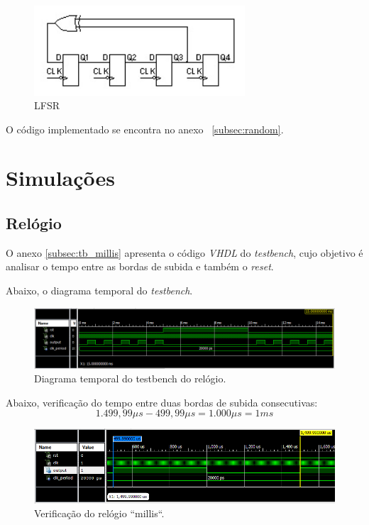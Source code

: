 \documentclass[12pt]{article}
\begin{document}
\begin{figure}[!h]
    \centering
    \includegraphics[width=0.7\textwidth]{img/lf.jpg}
    \caption{LFSR}
    \label{rand}
\end{figure}

O código implementado se encontra no anexo  ~\ref{subsec:random}.

\clearpage
\section{Simulações}
\subsection{Relógio}

O anexo \ref{subsec:tb_millis} apresenta o código \emph{VHDL} do \emph{testbench}, cujo objetivo é analisar o tempo entre as bordas de subida e também o \emph{reset}.

Abaixo, o diagrama temporal do \emph{testbench}.

\begin{figure}[!h]
    \centering
    \includegraphics[width=1.0\textwidth]{img/tb_millis.png}
    \caption{Diagrama temporal do testbench do relógio.}
\end{figure}

Abaixo, verificação do tempo entre duas bordas de subida consecutivas: \begin{equation}
    1.499,99\mu s - 499,99\mu s = 1.000\mu s = 1ms
\end{equation}

\begin{figure}[!h]
    \centering
    \includegraphics[width=1.0\textwidth]{img/tb_millis_zoom_1s.png}
    \caption{Verificação do relógio ``millis``.}
\end{figure}
\end{document}
